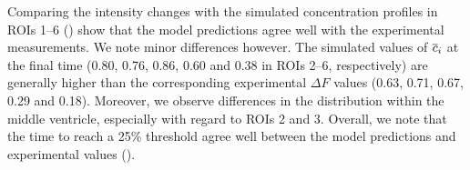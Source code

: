 \documentclass{WileyMSP-template}
\begin{document}
Comparing the intensity changes with the simulated concentration
profiles in ROIs 1--6 () show that the
model predictions agree well with the experimental measurements. We
note minor differences however. The simulated values of $\overline{c}_i$ at
the final time (0.80, 0.76, 0.86, 0.60 and 0.38 in ROIs 2--6, respectively)
are generally higher than the corresponding experimental $\Delta F$
values (0.63, 0.71, 0.67, 0.29 and 0.18). Moreover, we observe
differences in the distribution within the middle ventricle,
especially with regard to ROIs 2 and 3. Overall, we note that the time
to reach a 25\% threshold agree well between the model predictions and
experimental values ().


\end{document}

